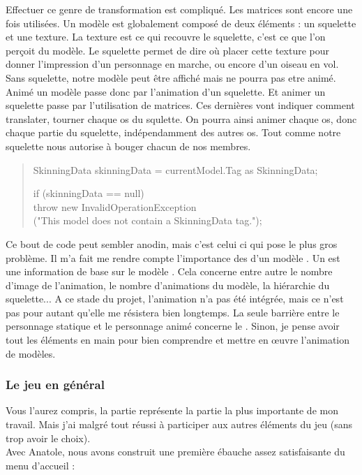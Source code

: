 \documentclass{article}
\begin{document}
Effectuer ce genre de transformation est compliqué. Les matrices sont encore une fois utilisées. Un modèle  est globalement composé de deux éléments : un squelette et une texture. La texture est ce qui recouvre le squelette, c'est ce que l'on perçoit du modèle. Le squelette permet de dire où placer cette texture pour donner l'impression d'un personnage en marche, ou encore d'un oiseau en vol. Sans squelette, notre modèle peut être affiché mais ne pourra pas etre animé.\\
Animé un modèle passe donc par l'animation d'un squelette. Et animer un squelette passe par l'utilisation de matrices. Ces dernières vont indiquer comment translater, tourner chaque os du squlette. On pourra ainsi animer chaque os, donc chaque partie du squelette, indépendamment des autres os. Tout comme notre squelette nous autorise à bouger chacun de nos membres.\\

\newpage
\begin{quote}
SkinningData skinningData = currentModel.Tag as SkinningData;

if (skinningData == null)\\
\hspace*{0.5cm}       throw new InvalidOperationException\\
\hspace*{1.0cm}             ("This model does not contain a SkinningData tag.");\\

\end{quote}

Ce bout de code peut sembler anodin, mais c'est celui ci qui pose le plus gros problème. Il m'a fait me rendre compte l'importance des  d'un modèle . Un  est une information de base sur le modèle . Cela concerne entre autre le nombre d'image de l'animation, le nombre d'animations du modèle, la hiérarchie du squelette... A ce stade du projet, l'animation n'a pas été intégrée, mais ce n'est pas pour autant qu'elle me résistera bien longtemps. La seule barrière entre le personnage statique et le personnage animé concerne le . Sinon, je pense avoir tout les éléments en main pour bien comprendre et mettre en \oe uvre l'animation de modèles.  

\subsubsection{Le jeu en général}
Vous l'aurez compris, la partie  représente la partie la plus importante de mon travail. Mais j'ai malgré tout réussi à participer aux autres éléments du jeu (sans trop avoir le choix).\\
Avec Anatole, nous avons construit une première ébauche assez satisfaisante du menu d'accueil : 
\end{document}
